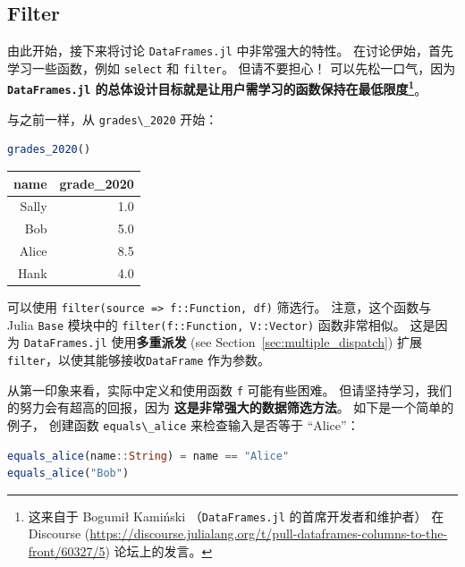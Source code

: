 \documentclass[
  notoc %
]{tufte-book}
\newcommand{\passthrough}[1]{#1}
\begin{document}
\hypertarget{sec:filter}{%
\subsection{Filter}\label{sec:filter}}

由此开始，接下来将讨论 \passthrough{\lstinline!DataFrames.jl!}
中非常强大的特性。 在讨论伊始，首先学习一些函数，例如
\passthrough{\lstinline!select!} 和 \passthrough{\lstinline!filter!}。
但请不要担心！ 可以先松一口气，因为
\textbf{\passthrough{\lstinline!DataFrames.jl!}
的总体设计目标就是让用户需学习的函数保持在最低限度\footnote{这来自于
  Bogumił Kamiński （\passthrough{\lstinline!DataFrames.jl!}
  的首席开发者和维护者） 在 Discourse
  (\url{https://discourse.julialang.org/t/pull-dataframes-columns-to-the-front/60327/5})
  论坛上的发言。}}。

与之前一样，从 \passthrough{\lstinline!grades\_2020!} 开始：

\begin{lstlisting}[language=Julia]
grades_2020()
\end{lstlisting}

\begin{longtable}[]{@{}rr@{}}
\toprule
name & grade\_2020 \\
\midrule
\endhead
Sally & 1.0 \\
Bob & 5.0 \\
Alice & 8.5 \\
Hank & 4.0 \\
\bottomrule
\end{longtable}

可以使用 \passthrough{\lstinline!filter(source => f::Function, df)!}
筛选行。 注意，这个函数与 Julia \passthrough{\lstinline!Base!} 模块中的
\passthrough{\lstinline!filter(f::Function, V::Vector)!} 函数非常相似。
这是因为 \passthrough{\lstinline!DataFrames.jl!} 使用\textbf{多重派发}
(see Section~\ref{sec:multiple_dispatch})
扩展\passthrough{\lstinline!filter!}，以使其能够接收\passthrough{\lstinline!DataFrame!}
作为参数。

从第一印象来看，实际中定义和使用函数 \passthrough{\lstinline!f!}
可能有些困难。 但请坚持学习，我们的努力会有超高的回报，因为
\textbf{这是非常强大的数据筛选方法}。 如下是一个简单的例子， 创建函数
\passthrough{\lstinline!equals\_alice!} 来检查输入是否等于 ``Alice''：

\begin{lstlisting}[language=Julia]
equals_alice(name::String) = name == "Alice"
equals_alice("Bob")
\end{lstlisting}
\end{document}
